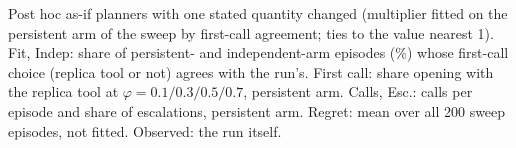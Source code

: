 \begin{table}[!htbp]
\centering
\caption{Post hoc as-if planners with one stated quantity changed (multiplier fitted on the persistent arm of the sweep by first-call agreement; ties to the value nearest 1). Fit, Indep: share of persistent- and independent-arm episodes (\%) whose first-call choice (replica tool or not) agrees with the run's. First call: share opening with the replica tool at $\varphi=0.1/0.3/0.5/0.7$, persistent arm. Calls, Esc.: calls per episode and share of escalations, persistent arm. Regret: mean over all 200 sweep episodes, not fitted. Observed: the run itself.}
\label{tab:asif-loss}
\scriptsize\setlength{\tabcolsep}{3pt}
\resizebox{\linewidth}{!}{}
\end{table}
